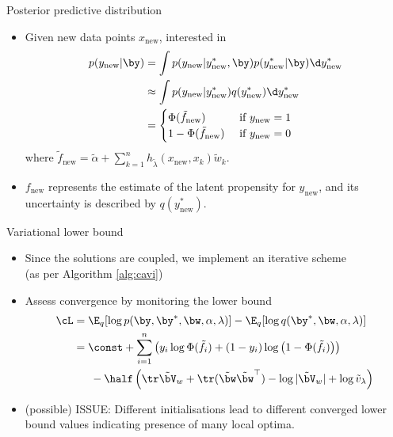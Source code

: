 \begin{frame}{Posterior predictive distribution}
  \begin{itemize}\setlength\itemsep{1em}
    \item Given new data points $x_{\text{new}}$, interested in
    \begin{align*}
      p(y_{\text{new}}|\by) &= \int p(y_{\text{new}} | y^*_{\text{new}}, \by) p (y^*_{\text{new}} | \by) \d y^*_{\text{new}} \\
      &\approx \int p(y_{\text{new}} | y^*_{\text{new}}) q (y^*_{\text{new}}) \d y^*_{\text{new}} \\
      &= \begin{cases}
        \Phi(\tilde f_{\text{new}}) & \text{ if } y_{\text{new}} = 1 \\
        1 - \Phi(\tilde f_{\text{new}}) & \text{ if } y_{\text{new}} = 0 \\
      \end{cases}
    \end{align*}
    where $\tilde f_{\text{new}} = \tilde\alpha + {\sum_{k=1}^n} h_{\tilde\lambda}(x_{\text{new}}, x_k)\tilde w_k$.
    \item $f_{\text{new}}$ represents the estimate of the latent propensity for $y_{\text{new}}$, and its uncertainty is described by $q(y_{\text{new}}^*)$.
  \end{itemize}
\end{frame}

\begin{frame}{Variational lower bound}
  \begin{itemize}\setlength\itemsep{1em}
    \item Since the solutions are coupled, we implement an iterative scheme \\ (as per Algorithm \ref{alg:cavi})
    \item Assess convergence by monitoring the lower bound
    \begin{align*}
      \cL 
      &= \E_q[\log p(\by,\by^*,\bw,\alpha,\lambda)] - \E_q[\log q(\by^*,\bw,\alpha,\lambda)] \\
      &= \const + \sum_{i=1}^n \left(y_i \log \Phi(\tilde f_i) + (1-y_i) \log \big(1 - \Phi(\tilde f_i)\big)\right) \\
      &\phantom{==}-\half \left( \tr\tilde\bV_w + \tr (\tilde\bw\tilde\bw^\top) - \log \vert \tilde\bV_w \vert + \log \tilde v_\lambda \right) 
    \end{align*}
    \item (possible) ISSUE: Different initialisations lead to different converged lower bound values indicating presence of many local optima.
  \end{itemize}
\end{frame}











